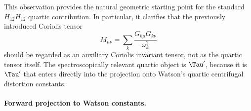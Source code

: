 This observation provides the natural geometric starting point for the standard
$H_{12}H_{12}$ quartic contribution.  In particular, it clarifies that the
previously introduced Coriolis tensor
\begin{equation}
M_{\mu\nu}=
\sum_k \frac{G_{k\mu}G_{k\nu}}{\omega_k^2}
\end{equation}
should be regarded as an auxiliary Coriolis invariant tensor, not as the
quartic tensor itself.  The spectroscopically relevant quartic object is
$\Tau'$, because it is $\Tau'$ that enters directly into the projection onto
Watson's quartic centrifugal distortion constants.

\paragraph{Forward projection to Watson constants.}

